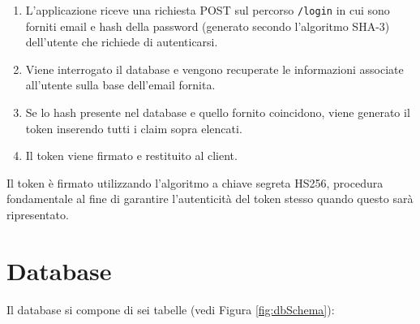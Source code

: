 	\begin{enumerate}
		\item L'applicazione riceve una richiesta POST sul percorso \texttt{/login} in cui sono forniti email e hash della password (generato secondo l'algoritmo SHA-3) dell'utente che richiede di autenticarsi.
		
		\item Viene interrogato il database e vengono recuperate le informazioni associate all'utente sulla base dell'email fornita.
		
		\item Se lo hash presente nel database e quello fornito coincidono, viene generato il token inserendo tutti i claim sopra elencati.
		
		\item Il token viene firmato e restituito al client.
	\end{enumerate}
	
	Il token è firmato utilizzando l'algoritmo a chiave segreta HS256, procedura fondamentale al fine di garantire l'autenticità del token stesso quando questo sarà ripresentato.
	
	
\section{Database}

	Il database si compone di sei tabelle (vedi Figura \ref{fig:dbSchema}):
	
